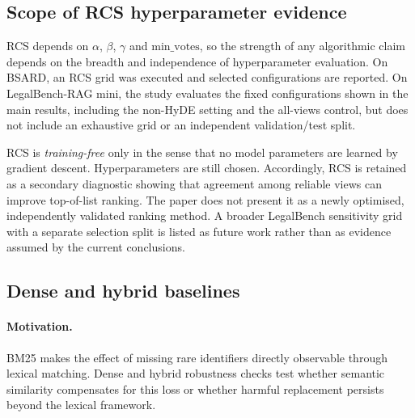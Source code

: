 \documentclass[a4paper,fleqn]{cas-dc}
\begin{document}
\subsection{Scope of RCS hyperparameter evidence}
\label{sec:ablation-rcs-grid}

RCS depends on $\alpha$, $\beta$, $\gamma$ and
$\text{min\_votes}$, so the strength of any algorithmic claim depends on
the breadth and independence of hyperparameter evaluation. On BSARD, an
RCS grid was executed and selected configurations are reported. On
LegalBench-RAG mini, the study evaluates the fixed configurations shown
in the main results, including the non-HyDE setting and the all-views
control, but does not include an exhaustive grid or an independent
validation/test split.

\begin{table}[h]
\centering
\caption{Scope of the RCS hyperparameter evidence reported in this study.}
\label{tab:rcs-grid-status}
\end{table}

RCS is \emph{training-free} only in the sense that no model parameters
are learned by gradient descent. Hyperparameters are still chosen.
Accordingly, RCS is retained as a secondary diagnostic showing that
agreement among reliable views can improve top-of-list ranking. The
paper does not present it as a newly optimised, independently validated
ranking method. A broader LegalBench sensitivity grid with a separate
selection split is listed as future work rather than as evidence assumed
by the current conclusions.

\subsection{Dense and hybrid baselines}
\label{sec:ablation-dense-hybrid}
\paragraph{Motivation.}
BM25 makes the effect of missing rare identifiers directly
observable through lexical matching. Dense and hybrid robustness
checks test whether semantic similarity compensates for this loss
or whether harmful replacement persists beyond the lexical
framework.
\end{document}
